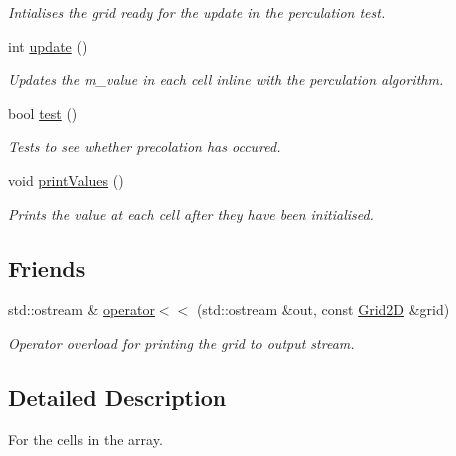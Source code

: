 \begin{DoxyCompactItemize}
\begin{DoxyCompactList}\small\item\em Intialises the grid ready for the update in the perculation test. \end{DoxyCompactList}\item 
int \hyperlink{class_grid2_d_a93716d994875e2a03ad51fb20a113687}{update} ()
\begin{DoxyCompactList}\small\item\em Updates the m\+\_\+value in each cell inline with the perculation algorithm. \end{DoxyCompactList}\item 
bool \hyperlink{class_grid2_d_a01288e0ef6890191f0f907a708c57fbc}{test} ()
\begin{DoxyCompactList}\small\item\em Tests to see whether precolation has occured. \end{DoxyCompactList}\item 
\mbox{\label{class_grid2_d_ac3c91c6118ef0d79587f92fab120c144}} 
void \hyperlink{class_grid2_d_ac3c91c6118ef0d79587f92fab120c144}{print\+Values} ()
\begin{DoxyCompactList}\small\item\em Prints the value at each cell after they have been initialised. \end{DoxyCompactList}\end{DoxyCompactItemize}
\subsection*{Friends}
\begin{DoxyCompactItemize}
\item 
std\+::ostream \& \hyperlink{class_grid2_d_a86aad296a546a8469ae64cfe33a5a370}{operator$<$$<$} (std\+::ostream \&out, const \hyperlink{class_grid2_d}{Grid2D} \&grid)
\begin{DoxyCompactList}\small\item\em Operator overload for printing the grid to output stream. \end{DoxyCompactList}\end{DoxyCompactItemize}


\subsection{Detailed Description}
For the cells in the array. 

